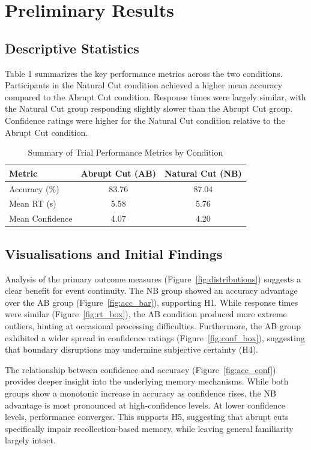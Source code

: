 \documentclass[11pt, a4paper]{article}
\begin{document}
\section{Preliminary Results}

\subsection{Descriptive Statistics}

Table 1 summarizes the key performance metrics across the two conditions. Participants in the Natural Cut condition achieved a higher mean accuracy compared to the Abrupt Cut condition. Response times were largely similar, with the Natural Cut group responding slightly slower than the Abrupt Cut group. Confidence ratings were higher for the Natural Cut condition relative to the Abrupt Cut condition.

\begin{table}[h]
\centering
\caption{Summary of Trial Performance Metrics by Condition}
\begin{tabular}{lcc}
\toprule
Metric & Abrupt Cut (AB) & Natural Cut (NB) \\
\midrule
Accuracy (\%) & 83.76 & 87.04 \\
Mean RT (s) & 5.58 & 5.76 \\
Mean Confidence & 4.07 & 4.20 \\
\bottomrule
\end{tabular}
\label{tab:summary_stats}
\end{table}

\subsection{Visualisations and Initial Findings}

Analysis of the primary outcome measures (Figure~\ref{fig:distributions}) suggests a clear benefit for event continuity. The NB group showed an accuracy advantage over the AB group (Figure~\ref{fig:acc_bar}), supporting H1. While response times were similar (Figure~\ref{fig:rt_box}), the AB condition produced more extreme outliers, hinting at occasional processing difficulties. Furthermore, the AB group exhibited a wider spread in confidence ratings (Figure~\ref{fig:conf_box}), suggesting that boundary disruptions may undermine subjective certainty (H4).

The relationship between confidence and accuracy (Figure~\ref{fig:acc_conf}) provides deeper insight into the underlying memory mechanisms. While both groups show a monotonic increase in accuracy as confidence rises, the NB advantage is most pronounced at high-confidence levels. At lower confidence levels, performance converges. This supports H5, suggesting that abrupt cuts specifically impair recollection-based memory, while leaving general familiarity largely intact.
\end{document}
